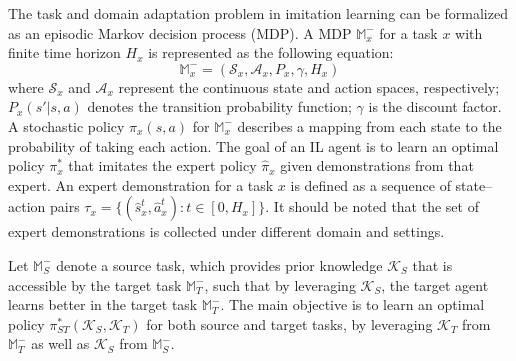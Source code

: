 The task and domain adaptation problem in imitation learning can be formalized as an episodic Markov decision process (MDP).
A MDP $\mathbb{M}^-_x$ for a task $x$ with finite time horizon $H_x$ \cite{RL_AnIntroductionBook} is represented as the following equation:
\begin{equation}
  \mathbb{M}^-_x = (\mathcal{S}_x, \mathcal{A}_x, P_x, \gamma, H_x)
\end{equation}
where
$\mathcal{S}_x$ and $\mathcal{A}_x$ represent the continuous state and action spaces, respectively;
$P_x(s'|s,a)$ denotes the transition probability function;
$\gamma$ is the discount factor.
A stochastic policy $\pi_x(s,a)$ for $\mathbb{M}^-_x$
describes a mapping from each state to the probability of taking each action.
The goal of an IL agent is to learn an optimal policy $\pi^{*}_x$ that imitates the expert policy $\hat{\pi}_x$ given demonstrations from that expert.
An expert demonstration for a task $x$ is defined as a sequence of state--action pairs $\tau_{x} = \{(\hat{s}^t_{x}, \hat{a}^t_{x}) : t \in [0, H_x]\}$.
It should be noted that the set of expert demonstrations is collected under different domain and settings.

Let $\mathbb{M}^-_{S}$ denote a source task,
which provides prior knowledge $\mathcal{K}_S$ that is accessible by the target task $\mathbb{M}^-_T$,
such that by leveraging $\mathcal{K}_S$,
the target agent learns better in the target task $\mathbb{M}^-_T$.
The main objective is to learn an optimal policy $\pi^{*}_{ST}(\mathcal{K}_S, \mathcal{K}_T)$ for both source and target tasks,
by leveraging $\mathcal{K}_T$ from $\mathbb{M}^-_T$ as well as $\mathcal{K}_S$ from $\mathbb{M}^-_S$.
